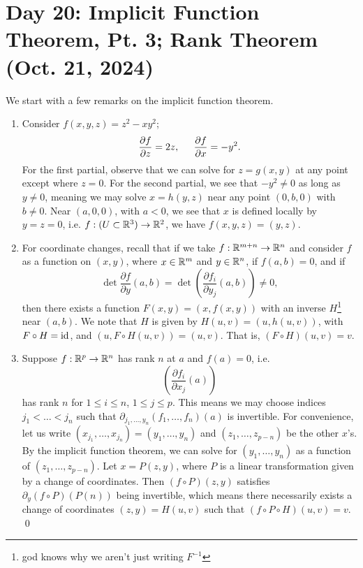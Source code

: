 \section{Day 20: Implicit Function Theorem, Pt. 3; Rank Theorem (Oct. 21, 2024)}
We start with a few remarks on the implicit function theorem.
\begin{enumerate}[label=(\alph*)]
    \item Consider $f(x, y, z) = z^2 - xy^2$;
    \[ \frac{\partial f}{\partial z} = 2z, \hspace{0.2in} \frac{\partial f}{\partial x} = -y^2. \]
    For the first partial, observe that we can solve for $z = g(x, y)$ at any point except where $z = 0$. For the second partial, we see that $-y^2 \neq 0$ as long as $y \neq 0$, meaning we may solve $x = h(y, z)$ near any point $(0, b, 0)$ with $b \neq 0$. Near $(a, 0, 0)$, with $a < 0$, we see that $x$ is defined locally by $y = z = 0$, i.e. $f : (U \subset \mathbb R^3) \to \mathbb R^2$, we have $f(x, y, z) = (y, z)$.
    \item For coordinate changes, recall that if we take $f : \mathbb R^{m + n} \to \mathbb R^n$ and consider $f$ as a function on $(x, y)$, where $x \in \mathbb R^m$ and $y \in \mathbb R^n$, if $f(a, b) = 0$, and if
    \[ \det \frac{\partial f}{\partial y}(a, b) = \det \left( \frac{\partial f_i}{\partial y_j} (a, b) \right) \neq 0, \]
    then there exists a function $F(x, y) = (x, f(x, y))$ with an inverse $H$\footnote{god knows why we aren't just writing $F^{-1}$} near $(a, b)$. We note that $H$ is given by $H(u, v) = (u, h(u, v))$, with $F \circ H = \mathrm{id}$, and $(u, F \circ H(u, v)) = (u, v)$. That is, $(F \circ H)(u, v) = v$.
    \item Suppose $f : \mathbb R^p \to \mathbb R^n$ has rank $n$ at $a$ and $f(a) = 0$, i.e.
    \[ \left(\frac{\partial f_i}{\partial x_j}(a)\right) \]
    has rank $n$ for $1 \leq i \leq n$, $1 \leq j \leq p$. This means we may choose indices $j_1 < \dots < j_n$ such that $\partial_{j_1, \dots, y_n} (f_1, \dots, f_n)(a)$ is invertible. For convenience, let us write $(x_{j_1}, \dots, x_{j_n}) = (y_1, \dots, y_n)$ and $(z_1, \dots, z_{p-n})$ be the other $x$'s. By the implicit function theorem, we can solve for $(y_1, \dots, y_n)$ as a function of $(z_1, \dots, z_{p-n})$. Let $x = P(z, y)$, where $P$ is a linear transformation given by a change of coordinates. Then $(f \circ P)(z, y)$ satisfies $\partial_y (f \circ P) (P(n))$ being invertible, which means there necessarily exists a change of coordinates $(z, y) = H(u, v)$ such that $(f \circ P \circ H)(u, v) = v$. \qed
\end{enumerate}
